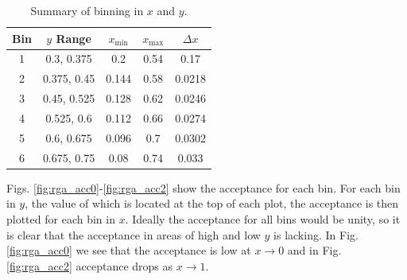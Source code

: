 \begin{table}[h!]
	\centering
	\begin{tabular}{ |c|c|c|c|c| } 
		\hline
		Bin & $y$ Range & $x_{\mathrm{min}}$ & $x_{\mathrm{max}}$ & $\Delta x$ \\
		\hline
		1 & 0.3, 0.375 & 0.2 & 0.54 & 0.17 \\
		2 & 0.375, 0.45 & 0.144 & 0.58 & 0.0218 \\
		3 & 0.45, 0.525 & 0.128 & 0.62 & 0.0246 \\
		4 & 0.525, 0.6 & 0.112 & 0.66 & 0.0274 \\
		5 & 0.6, 0.675 & 0.096 & 0.7 & 0.0302 \\
		6 & 0.675, 0.75 & 0.08 & 0.74 & 0.033 \\
		\hline
	\end{tabular}
	\caption{Summary of binning in $x$ and $y$.}
	\label{table:xB_bins}
\end{table}

Figs. \ref{fig:rga_acc0}-\ref{fig:rga_acc2} show the acceptance for each bin. For each bin in $y$, the value of which is located at the top of each plot, the acceptance is then plotted for each bin in $x$. Ideally the acceptance for all bins would be unity, so it is clear that the acceptance in areas of high and low $y$ is lacking. In Fig. \ref{fig:rga_acc0} we see that the acceptance is low at $x \rightarrow 0$ and in Fig. \ref{fig:rga_acc2} acceptance drops as $x \rightarrow 1$. 

